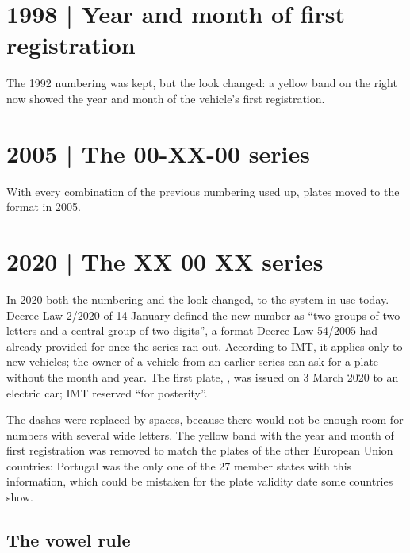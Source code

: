 \section{1998 | Year and month of first registration}

The 1992 numbering was kept, but the look changed: a yellow band on the right now
showed the year and month of the vehicle's first registration.


\section{2005 | The 00-XX-00 series}

With every combination of the previous numbering used up, plates moved to the
 format in 2005.


\section{2020 | The XX 00 XX series}

In 2020 both the numbering and the look changed, to the system in use today.
Decree-Law 2/2020 of 14 January defined the new number as “two groups of two
letters and a central group of two digits”, a format Decree-Law 54/2005 had
already provided for once the  series ran out. According to IMT,
it applies only to new vehicles; the owner of a vehicle from an earlier series
can ask for a plate without the month and year. The first plate, ,
was issued on 3 March 2020 to an electric car; IMT reserved 
“for posterity”.


The dashes were replaced by spaces, because there would not be enough room for
numbers with several wide letters. The yellow band with the year and month of
first registration was removed to match the plates of the other European Union
countries: Portugal was the only one of the 27 member states with this
information, which could be mistaken for the plate validity date some countries
show.

\subsection{The vowel rule}

